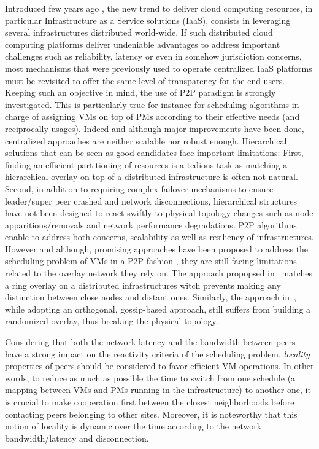 Introduced few years ago \cite{greenberg:sigcomm09}, the new trend to deliver
cloud computing resources, in particular Infrastructure as a Service solutions
(IaaS), consists in leveraging several infrastructures distributed world-wide.
If such distributed cloud computing platforms deliver undeniable advantages to
address important challenges such as reliability, latency or even in somehow
jurisdiction concerns, most mechanisms that were previously used to operate
centralized IaaS platforms must be revisited to offer the same level of
transparency for the end-users.  Keeping such an objective in mind, the use of
P2P paradigm is strongly investigated. This is particularly true for instance
for scheduling algorithms in charge of assigning VMs on top of PMs according to
their effective needs (and reciprocally usages).  Indeed and although major
improvements have been done, centralized approaches \cite{hermenier:2013} are
neither scalable nor robust enough.  Hierarchical solutions
\cite{feller:ccgrid12} that can be seen as good candidates face important
limitations: First, finding an efficient partitioning of resources is a tedious
task as matching a hierarchical overlay on top of a distributed infrastructure
is often not natural.  Second, in addition to requiring complex failover
mechanisms to ensure leader/super peer crashed and network disconnections,
hierarchical structures have not been designed to react swiftly to physical
topology changes such as node apparitions/removals and network performance
degradations.  P2P algorithms enable to address both concerns, \ie scalability
as well as resiliency of infrastructures. However and although, promising
approaches have been proposed to address the scheduling problem of VMs in a P2P
fashion \cite{quesnel:2012,feller:cloudcom12}, they are still facing
limitations related to the overlay network they rely on. The approach propopsed
in~\cite{quesnel:2012} matches a ring overlay  on a distributed infrastructures
witch prevents making any distinction between close nodes and distant ones.
Similarly, the approach in~\cite{feller:cloudcom12}, while adopting an
orthogonal, gossip-based approach, still suffers from building a randomized
overlay, thus breaking the physical topology.

Considering that both the network latency and the bandwidth between peers have
a strong impact on the reactivity criteria of the scheduling problem,
\emph{locality} properties of peers should be considered to favor efficient VM
operations.  In other words, to reduce as much as possible the time to switch
from one schedule (\ie a mapping between VMs and PMs running in the
infrastructure) to another one, it is crucial to make cooperation first between
the closest neighborhoods before contacting peers belonging to other sites.
Moreover, it is noteworthy that this notion of locality is dynamic over the
time according to the network bandwidth/latency and disconnection.

